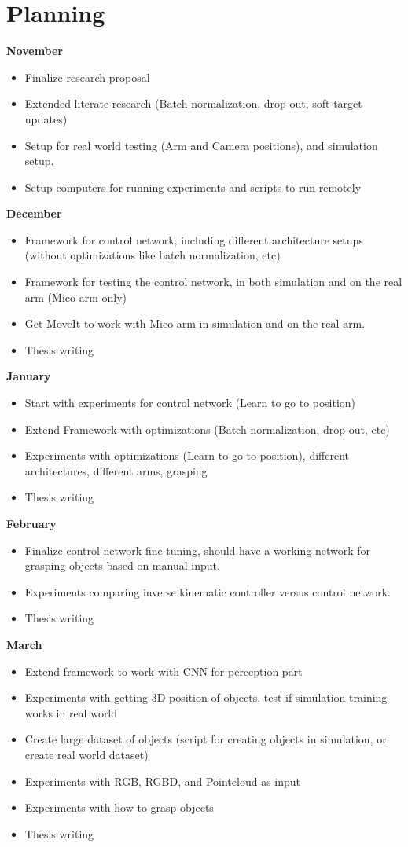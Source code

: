 \section{Planning}

\textbf{November}
\begin{itemize}
  \item Finalize research proposal
  \item Extended literate research (Batch normalization, drop-out, soft-target updates)
  \item Setup for real world testing (Arm and Camera positions), and simulation setup.
  \item Setup computers for running experiments and scripts to run remotely  
\end{itemize} 
\textbf{December}
\begin{itemize}
  \item Framework for control network, including different architecture setups (without optimizations like batch normalization, etc)
  \item Framework for testing the control network, in both simulation and on the real arm (Mico arm only)
  \item Get MoveIt to work with Mico arm in simulation and on the real arm. 
  \item Thesis writing
\end{itemize}
\textbf{January}
\begin{itemize}
  \item Start with experiments for control network (Learn to go to position)
  \item Extend Framework with optimizations (Batch normalization, drop-out, etc)
  \item Experiments with optimizations (Learn to go to position), different architectures, different arms, grasping
  \item Thesis writing
\end{itemize}
\textbf{February}
\begin{itemize}
  \item Finalize control network fine-tuning, should have a working network for grasping objects based on manual input.
  \item Experiments comparing inverse kinematic controller versus control network.
  \item Thesis writing
\end{itemize}
\textbf{March}
\begin{itemize}
  \item Extend framework to work with CNN for perception part
  \item Experiments with getting 3D position of objects, test if simulation training works in real world
  \item Create large dataset of objects (script for creating objects in simulation, or create real world dataset)
  \item Experiments with RGB, RGBD, and Pointcloud as input
  \item Experiments with how to grasp objects
  \item Thesis writing
\end{itemize}
